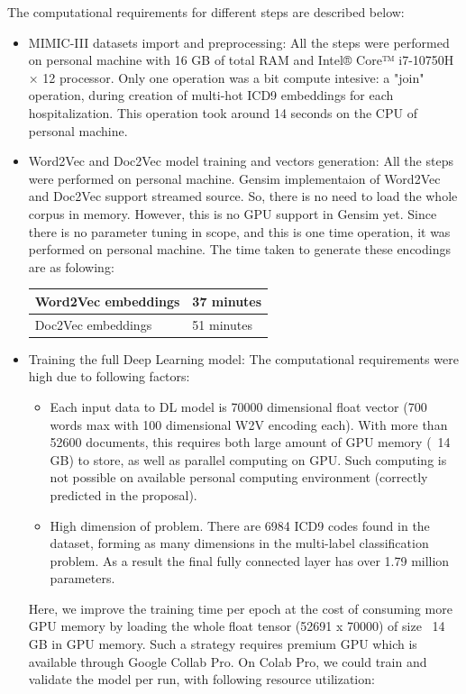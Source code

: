 \documentclass[11pt,a4paper]{article}
\begin{document}
The computational requirements for different steps are described below:
\begin{itemize}
	\item MIMIC-III datasets import and preprocessing: All the steps were performed on personal machine with 16 GB of total RAM and Intel® Core™ i7-10750H × 12 processor. Only one operation was a bit compute intesive: a "join" operation, during creation of multi-hot ICD9 embeddings for each hospitalization. This operation took around 14 seconds on the CPU of personal machine.
	\item Word2Vec and Doc2Vec model training and vectors generation: All the steps were performed on personal machine. Gensim implementaion of Word2Vec and Doc2Vec support streamed source. So, there is no need to load the whole corpus in memory. However, this is no GPU support in Gensim yet. Since there is no parameter tuning in scope, and this is one time operation, it was performed on personal machine. The time taken to generate these encodings are as folowing:
\newline

\begin{small}
\begin{tabular}{ ll }
	\hline
   		Word2Vec embeddings & 37 minutes \\
  	\hline
    		Doc2Vec embeddings & 51 minutes \\ 
  	\hline
\end{tabular}
\end{small}
\newline
	\item Training the full Deep Learning model: The computational requirements were high due to following factors:
	\begin{itemize}
		\item Each input data to DL model is 70000 dimensional float vector (700 words max with 100 dimensional W2V encoding each). With more than 52600 documents, this requires both large amount of GPU  memory (~14 GB) to store, as well as parallel computing on GPU. Such computing is not possible on available  personal computing environment (correctly predicted in the proposal).
		\item High dimension of problem. There are 6984 ICD9 codes found in the dataset, forming as many dimensions in the multi-label classification problem. As a result the final fully connected layer has over 1.79 million parameters.
	\end{itemize}
	Here, we improve the training time per epoch at the cost of consuming more GPU memory by loading the whole float tensor (52691 x 70000) of size ~14 GB in GPU memory. Such a strategy requires premium GPU  which is available through Google Collab Pro.
	On Colab Pro, we could train and validate the model per run, with following resource utilization:
\newline


\end{itemize}
\end{document}
